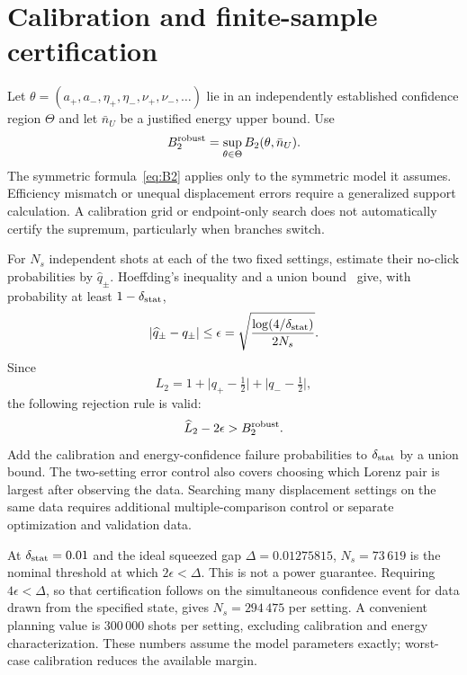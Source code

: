 \documentclass[11pt,a4paper]{article}
\newcommand{\abs}[1]{\lvert #1\rvert}
\begin{document}
\section{Calibration and finite-sample certification}\label{sec:statistics}
Let $\theta=(a_+,a_-,\eta_+,\eta_-,\nu_+,\nu_-,\ldots)$ lie in an independently
established confidence region $\Theta$ and let $\bar n_U$ be a justified energy
upper bound. Use
\begin{equation}
 B_2^{\rm robust}=\sup_{\theta\in\Theta}
 B_2(\theta,\bar n_U).\label{eq:robust}
\end{equation}
The symmetric formula~\eqref{eq:B2} applies only to the symmetric model it
assumes. Efficiency mismatch or unequal displacement errors require a
generalized support calculation. A calibration grid or endpoint-only search
does not automatically certify the supremum, particularly when branches switch.

For $N_s$ independent shots at each of the two fixed settings, estimate their
no-click probabilities by $\widehat q_\pm$. Hoeffding's inequality and a union
bound~\cite{Hoeffding1963} give, with probability at least $1-\delta_{\rm stat}$,
\begin{equation}
 \abs{\widehat q_\pm-q_\pm}\leq
 \epsilon=\sqrt{\frac{\log(4/\delta_{\rm stat})}{2N_s}}.
 \label{eq:hoeffding}
\end{equation}
Since
\begin{equation}
 L_2=1+\abs{q_+-\tfrac12}+\abs{q_--\tfrac12},\label{eq:L2formula}
\end{equation}
the following rejection rule is valid:
\begin{equation}
 \widehat L_2-2\epsilon>B_2^{\rm robust}.\label{eq:reject}
\end{equation}
Add the calibration and energy-confidence failure probabilities to
$\delta_{\rm stat}$ by a union bound. The two-setting error control also
covers choosing which Lorenz pair is largest after observing the data.
Searching many displacement settings on the same data requires additional
multiple-comparison control or separate optimization and validation data.

At $\delta_{\rm stat}=0.01$ and the ideal squeezed gap
$\Delta=0.01275815$, $N_s=73\,619$ is the nominal threshold at which
$2\epsilon<\Delta$. This is not a power guarantee. Requiring
$4\epsilon<\Delta$, so that certification follows on the simultaneous
confidence event for data drawn from the specified state, gives
$N_s=294\,475$ per setting. A convenient planning value is $300\,000$
shots per setting, excluding calibration and energy characterization. These
numbers assume the model parameters exactly; worst-case calibration reduces
the available margin.
\end{document}
